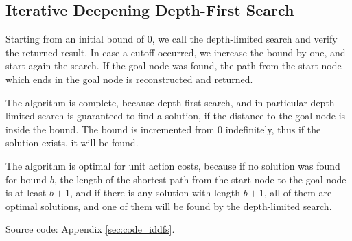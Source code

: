 \subsection{Iterative Deepening Depth-First Search}
\label{sec:iddfs}

Starting from an initial bound of 0, we call the depth-limited search and verify the returned result. In case a cutoff occurred, we increase the bound by one, and start again the search. If the goal node was found, the path from the start node which ends in the goal node is reconstructed and returned.

The algorithm is complete, because depth-first search, and in particular depth-limited search is guaranteed to find a solution, if the distance to the goal node is inside the bound. The bound is incremented from 0 indefinitely, thus if the solution exists, it will be found. 

The algorithm is optimal for unit action costs, because if no solution was found for bound $b$, the length of the shortest path from the start node to the goal node is at least $b+1$, and if there is any solution with length $b+1$, all of them are optimal solutions, and one of them will be found by the depth-limited search.

Source code: Appendix \ref{sec:code_iddfs}.


